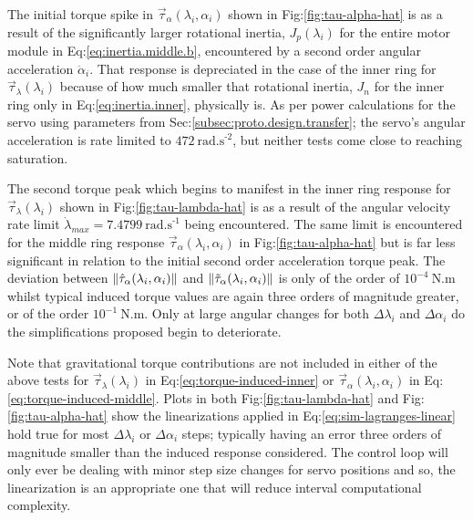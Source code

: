 \par
The initial torque spike in $\vec{\tau}_\alpha(\lambda_i,\alpha_i)$ shown in Fig:\ref{fig:tau-alpha-hat} is as a result of the significantly larger rotational inertia, $J_{p}(\lambda_i)$ for the entire motor module in Eq:\ref{eq:inertia.middle.b}, encountered by a second order angular acceleration $\ddot{\alpha}_i$. That response is depreciated in the case of the inner ring for $\vec{\tau}_\lambda(\lambda_i)$ because of how much smaller that rotational inertia, $J_n$ for the inner ring only in Eq:\ref{eq:inertia.inner}, physically is. As per power calculations for the servo using parameters from Sec:\ref{subsec:proto.design.transfer}; the servo's angular acceleration is rate limited to $472~\text{rad.s}^{\text{-}2}$, but neither tests come close to reaching saturation.
\par
The second torque peak which begins to manifest in the inner ring response for $\vec{\tau}_\lambda(\lambda_i)$ shown in Fig:\ref{fig:tau-lambda-hat} is as a result of the angular velocity rate limit $\dot{\lambda}_{max}=7.4799~\text{rad.s}^{\text{-}1}$ being encountered. The same limit is encountered for the middle ring response $\vec{\tau}_\alpha(\lambda_i,\alpha_i)$ in Fig:\ref{fig:tau-alpha-hat} but is far less significant in relation to the initial second order acceleration torque peak. The deviation between $\left\lVert\hat{\tau}_\alpha(\lambda_i,\alpha_i)\right\rVert$ and $\left\lVert\tilde{\tau}_\alpha(\lambda_i,\alpha_i)\right\rVert$ is only of the order of $10^{-4}~\text{N.m}$ whilst typical induced torque values are again three orders of magnitude greater, or of the order $10^{-1}~\text{N.m}$. Only at large angular changes for both $\Delta\lambda_i$ and $\Delta\alpha_i$ do the simplifications proposed begin to deteriorate.
\par
Note that gravitational torque contributions are not included in either of the above tests for $\vec{\tau}_\lambda(\lambda_i)$ in Eq:\ref{eq:torque-induced-inner} or $\vec{\tau}_\alpha(\lambda_i,\alpha_i)$ in Eq:\ref{eq:torque-induced-middle}. Plots in both Fig:\ref{fig:tau-lambda-hat} and Fig:\ref{fig:tau-alpha-hat} show the linearizations applied in Eq:\ref{eq:sim-lagranges-linear} hold true for most $\Delta\lambda_i$ or $\Delta\alpha_i$ steps; typically having an error three orders of magnitude smaller than the induced response considered. The control loop will only ever be dealing with minor step size changes for servo positions and so, the linearization is an appropriate one that will reduce interval computational complexity.
